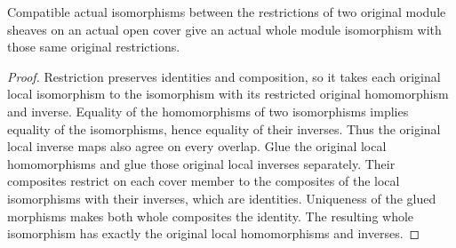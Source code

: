 \begin{theorem}
\label{thm:scheme-original-module-isomorphism-gluing}
\leanok
Compatible actual isomorphisms between the restrictions of two original
module sheaves on an actual open cover give an actual whole module
isomorphism with those same original restrictions.
\end{theorem}
\begin{proof}
Restriction preserves identities and composition, so it takes each
original local isomorphism to the isomorphism with its restricted
original homomorphism and inverse. Equality of the homomorphisms of
two isomorphisms implies equality of the isomorphisms, hence equality
of their inverses. Thus the original local inverse maps also agree on
every overlap. Glue the original local homomorphisms and glue those
original local inverses separately. Their composites restrict on each
cover member to the composites of the local isomorphisms with their
inverses, which are identities. Uniqueness of the glued morphisms
makes both whole composites the identity. The resulting whole
isomorphism has exactly the original local homomorphisms and inverses.
\end{proof}
